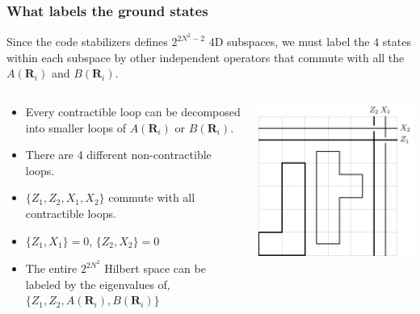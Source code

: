\documentclass{beamer}
\renewcommand{\(}{\left(}
\renewcommand{\)}{\right)}
\renewcommand{\[}{\left[}
\renewcommand{\]}{\right]}
\begin{document}
\begin{frame}
    \frametitle{What labels the ground states}
    Since the code stabilizers defines $2^{2N^2-2}$ 4D subspaces, we must label the $4$ states within each subspace by  other independent operators that commute with all the $A(\bm R_i)$ and $B(\bm R_i)$. 
    \pause
    \begin{columns}
        \begin{column}{0.55\textwidth}
            \begin{itemize}
                \item Every contractible loop can be decomposed into smaller loops of $A(\bm R_i)$ or $B(\bm R_i)$. 
                \item There are 4 different non-contractible loops. 
                \item $\{Z_1, Z_2, X_1, X_2\}$ commute with all contractible loops. 
                \item $\{Z_1, X_1\} = 0 $, $\{Z_2, X_2\} = 0 $
                \item The entire $2^{2N^2}$ Hilbert space can be labeled by the eigenvalues of, $\{Z_1, Z_2, A(\bm R_i), B(\bm R_i)\}$
            \end{itemize}
        \end{column}
        \begin{column}{0.45\textwidth}
            \vspace{10pt}
            \centering
            \includegraphics[scale=0.7, trim=0 0 0 0,clip]{decomp_loops.pdf}
        \end{column}
    \end{columns}
    
\end{frame}
\end{document}
